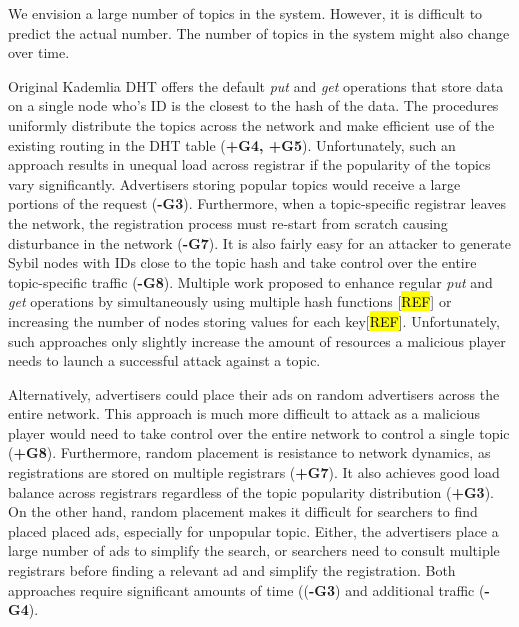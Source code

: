  We envision a large number of topics in the system. However, it is difficult to predict the actual number. The number of topics in the system might also change over time. 

Original Kademlia DHT offers the default \emph{put} and \emph{get} operations that store data on a single node who's ID is the closest to the hash of the data. The procedures uniformly distribute the topics across the network and make efficient use of the existing routing in the DHT table (\textbf{+G4, +G5}). Unfortunately, such an approach results in unequal load across registrar if the popularity of the topics vary significantly. Advertisers storing popular topics would receive a large portions of the request (\textbf{-G3}). Furthermore, when a topic-specific registrar leaves the network, the registration process must re-start from scratch causing disturbance in the network (\textbf{-G7}). It is also fairly easy for an attacker to generate Sybil nodes with IDs close to the topic hash and take control over the entire topic-specific traffic (\textbf{-G8}). Multiple work  proposed to enhance regular \emph{put} and \emph{get} operations by simultaneously using multiple hash functions [\hl{REF}] or increasing the number of nodes storing values for each key[\hl{REF}]. Unfortunately, such approaches only slightly increase the amount of resources a malicious player needs to launch a successful attack against a topic. 

Alternatively, advertisers could place their ads on random advertisers across the entire network. This approach is much more difficult to attack as a malicious player would need to take control over the entire network to control a single topic (\textbf{+G8}). Furthermore, random placement is resistance to network dynamics, as registrations are stored on multiple registrars (\textbf{+G7}). It also achieves good load balance across registrars regardless of the topic popularity distribution (\textbf{+G3}). On the other hand, random placement makes it difficult for searchers to find placed placed ads, especially for unpopular topic. Either, the advertisers place a large number of ads to simplify the search, or searchers need to consult multiple registrars before finding a relevant ad and simplify the registration. Both approaches require significant amounts of time ((\textbf{-G3}) and additional traffic (\textbf{-G4}). 

